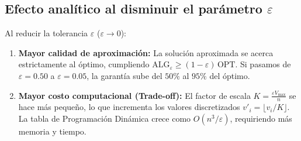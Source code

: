 \subsection{\texorpdfstring{Efecto analítico al disminuir el parámetro $\varepsilon$}{Efecto analitico al disminuir el parametro eps}}
Al reducir la tolerancia $\varepsilon$ ($\varepsilon \to 0$):
\begin{enumerate}
    \item \textbf{Mayor calidad de aproximación:} La solución aproximada se acerca estrictamente al óptimo, cumpliendo $\text{ALG}_\varepsilon \ge (1 - \varepsilon)\,\text{OPT}$. Si pasamos de $\varepsilon = 0.50$ a $\varepsilon = 0.05$, la garantía sube del $50\%$ al $95\%$ del óptimo.
    \item \textbf{Mayor costo computacional (Trade-off):} El factor de escala $K = \frac{\varepsilon V_{\max}}{n}$ se hace más pequeño, lo que incrementa los valores discretizados $v'_i = \lfloor v_i / K \rfloor$. La tabla de Programación Dinámica crece como $O(n^3/\varepsilon)$, requiriendo más memoria y tiempo.
\end{enumerate}
